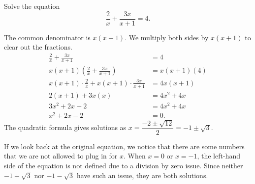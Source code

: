 \documentclass{ximera}
\begin{document}
\begin{example}
	Solve the equation
	\[  \frac{2}{x} + \frac{3x}{x+1} = 4.\]
	\begin{explanation}
		The common denominator is $x(x+1)$.  We multiply both sides by $x(x+1)$ to clear out the fractions.
		\begin{align*}
			\frac{2}{x} + \frac{3x}{x+1} &= 4	\\
			x(x+1) \left( \frac{2}{x} + \frac{3x}{x+1} \right) &= x(x+1) ( 4 )\\
			x(x+1) \cdot \frac{2}{x}  + x(x+1) \cdot \frac{3x}{x+1} &= 4x(x+1)\\
			2(x+1) + 3x(x) &= 4x^2 + 4x\\
			3x^2 + 2x + 2 &= 4x^2 + 4x\\
			x^2 + 2x - 2 &= 0.
		\end{align*}
		The quadratic formula gives solutions as $\displaystyle x = \dfrac{-2 \pm \sqrt{12}}{2} = -1 \pm \sqrt{3}$.
		
		If we look back at the original equation, we notice that there are some numbers that we are not allowed to plug in for $x$.  When $x=0$ or $x=-1$,
		the left-hand side of the equation is not defined due to a division by zero issue.  Since neither $-1 + \sqrt{3}$ nor $-1-\sqrt{3}$ have such an issue,
		they are both solutions.
	\end{explanation}
\end{example}

\begin{example}

	\begin{explanation}
	\end{explanation}
\end{example}
\end{document}
